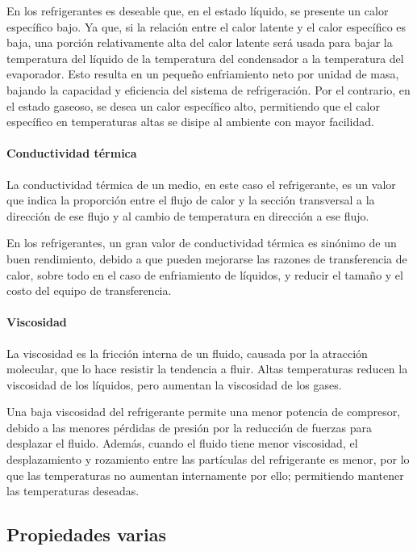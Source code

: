 	En los refrigerantes es deseable que, en el estado líquido, se presente un calor específico bajo. Ya que, si la relación entre el calor latente y el calor específico es baja, una porción relativamente alta del calor latente será usada para bajar la temperatura del líquido de la temperatura del condensador a la temperatura del evaporador. Esto resulta en un pequeño enfriamiento neto por unidad de masa, bajando la capacidad y eficiencia del sistema de refrigeración. Por el contrario, en el estado gaseoso, se desea un calor específico alto, permitiendo que el calor específico en temperaturas altas se disipe al ambiente con mayor facilidad.
	
	\paragraph{Conductividad térmica} La conductividad térmica de un medio, en este caso el refrigerante, es un valor que indica la proporción entre el flujo de calor y la sección transversal a la dirección de ese flujo y al cambio de temperatura en dirección a ese flujo.
	
	En los refrigerantes, un gran valor de conductividad térmica es sinónimo de un buen rendimiento, debido a que pueden mejorarse las razones de transferencia de calor, sobre todo en el caso de enfriamiento de líquidos, y reducir el tamaño y el costo del equipo de transferencia. 

	\paragraph{Viscosidad} La viscosidad es la fricción interna de un fluido, causada por la atracción molecular, que lo hace resistir la tendencia a fluir. Altas temperaturas reducen la viscosidad de los líquidos, pero aumentan la viscosidad de los gases.
	
	Una baja viscosidad del refrigerante permite una menor potencia de compresor, debido a las menores pérdidas de presión por la reducción de fuerzas para desplazar el fluido. Además, cuando el fluido tiene menor viscosidad, el desplazamiento y rozamiento entre las partículas del refrigerante es menor, por lo que las temperaturas no aumentan internamente por ello; permitiendo mantener las temperaturas deseadas.

	\subsection{Propiedades varias}

